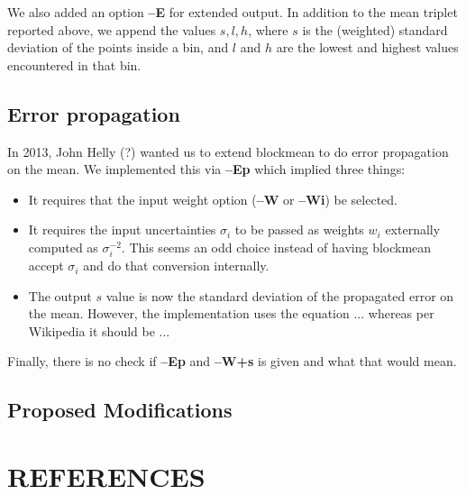 \documentclass[12pt,letterpaper,margin=0.5in]{report}
\begin{document}
We also added an option {\bf --E} for extended output.  In addition to the mean triplet reported above, we append
the values $s, l, h$, where $s$ is the (weighted) standard deviation of the points inside a bin, and $l$ and
$h$ are the lowest and highest values encountered in that bin.

\subsection*{Error propagation}

In 2013, John Helly (?) wanted us to extend blockmean to do error propagation on the mean.  We implemented
this via {\bf --Ep} which implied three things:
\begin{itemize}
	\item It requires that the input weight option ({\bf --W} or {\bf --Wi}) be selected.
	\item It requires the input uncertainties $\sigma_i$ to be passed as weights $w_i$ externally computed as $\sigma_i^{-2}$.
		This seems an odd choice instead of having blockmean accept $\sigma_i$ and do that conversion internally.
	\item The output $s$ value is now the standard deviation of the propagated error on the mean.  However, the
		implementation uses the equation ... whereas per Wikipedia it should be ...
\end{itemize}
Finally, there is no check if {\bf --Ep} and {\bf --W+s} is given and what that would mean.

\subsection*{Proposed Modifications}


\section*{REFERENCES}
\end{document}
